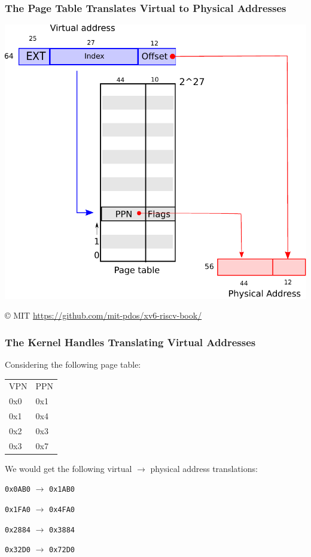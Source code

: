   \begin{frame}
    \frametitle{The Page Table Translates Virtual to Physical Addresses}

    \begin{center}
      \includegraphics[scale=0.5]{riscv_address.pdf}
    \end{center}

    © MIT \url{https://github.com/mit-pdos/xv6-riscv-book/}
  \end{frame}

  \begin{frame}
    \frametitle{The Kernel Handles Translating Virtual Addresses}

    Considering the following page table:

    \begin{center}
    {\ttfamily
    \begin{tabular}{ll}
      VPN  & PPN  \\
      0x0 & 0x1 \\
      0x1 & 0x4 \\
      0x2 & 0x3 \\
      0x3 & 0x7 \\
    \end{tabular}}
    \end{center}

    We would get the following virtual $\rightarrow$ physical address translations:

    \begin{center}
    \texttt{0x0AB0} $\rightarrow$ \texttt{0x1AB0}
    
    \texttt{0x1FA0} $\rightarrow$ \texttt{0x4FA0}

    \texttt{0x2884} $\rightarrow$ \texttt{0x3884}

    \texttt{0x32D0} $\rightarrow$ \texttt{0x72D0}
    \end{center}
  \end{frame}

